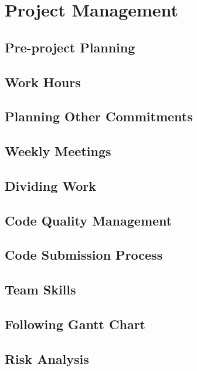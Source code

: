 \chapter{Project Management}
\label{chap:project-management}

\section{Pre-project Planning}
\label{sec:pre-project-planning}

\section{Work Hours}
\label{sec:work-hours}

\section{Planning Other Commitments}
\label{sec:planning-other-commitments}

\section{Weekly Meetings}
\label{sec:weekly-meetings}

\section{Dividing Work}
\label{sec:dividing-work}

\section{Code Quality Management}
\label{sec:code-quality-management}

\section{Code Submission Process}
\label{sec:code-submission-process}

\section{Team Skills}
\label{sec:team-skills}

\section{Following Gantt Chart}
\label{sec:following-gantt-chart}

\section{Risk Analysis}
\label{sec:risk-analysis}
